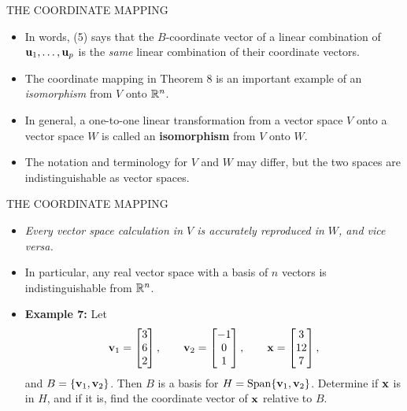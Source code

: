 \begin{frame}[shrink=8]{THE COORDINATE MAPPING}
\begin{itemize}
\item In words, (5) says that the $B$-coordinate vector of a linear combination of $\mathbf{u}_1,\ldots,\mathbf{u}_p$ is the \emph{same} linear combination of their coordinate vectors.
\item The coordinate mapping in Theorem 8 is an important example of an \emph{isomorphism} from $V$ onto $\mathbb{R}^n$.
\item In general, a one-to-one linear transformation from a vector space $V$ onto a vector space $W$ is called an \textbf{isomorphism} from $V$ onto $W$.
\item The notation and terminology for $V$ and $W$ may differ, but the two spaces are indistinguishable as vector spaces.
\end{itemize}
\end{frame}

\begin{frame}[shrink=11]{THE COORDINATE MAPPING}
\begin{itemize}
\item \emph{Every vector space calculation in $V$ is accurately reproduced in $W$, and vice versa.}
\item In particular, any real vector space with a basis of $n$ vectors is indistinguishable from $\mathbb{R}^n$.
\item \textbf{Example 7:} Let
\[
\mathbf{v}_1=\begin{bmatrix}3\\6\\2\end{bmatrix},\qquad
\mathbf{v}_2=\begin{bmatrix}-1\\0\\1\end{bmatrix},\qquad
\mathbf{x}=\begin{bmatrix}3\\12\\7\end{bmatrix},
\]
and $B=\{\mathbf{v}_1,\mathbf{v}_2\}$. Then $B$ is a basis for $H=\operatorname{Span}\{\mathbf{v}_1,\mathbf{v}_2\}$. Determine if $\mathbf{x}$ is in $H$, and if it is, find the coordinate vector of $\mathbf{x}$ relative to $B$.
\end{itemize}
\end{frame}

